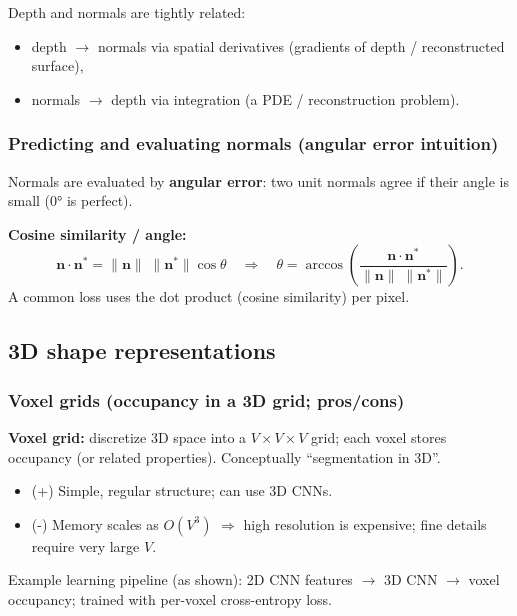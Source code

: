 \documentclass[11pt,a4paper]{article}
\newcommand{\vct}[1]{\bm{#1}}
\begin{document}
\begin{notebox}
Depth and normals are tightly related:
\begin{itemize}
  \item depth $\rightarrow$ normals via spatial derivatives (gradients of depth / reconstructed surface),
  \item normals $\rightarrow$ depth via integration (a PDE / reconstruction problem).
\end{itemize}
\end{notebox}

\subsubsection{Predicting and evaluating normals (angular error intuition)}
\begin{defbox}
Normals are evaluated by \textbf{angular error}:
two unit normals agree if their angle is small (0° is perfect).
\end{defbox}

\begin{mathrule}
\textbf{Cosine similarity / angle:}\quad
\[
\vct{n}\cdot \vct{n}^\ast = \|\vct{n}\|\;\|\vct{n}^\ast\|\cos\theta
\quad\Rightarrow\quad
\theta = \arccos\!\left(\frac{\vct{n}\cdot \vct{n}^\ast}{\|\vct{n}\|\;\|\vct{n}^\ast\|}\right).
\]
A common loss uses the dot product (cosine similarity) per pixel.
\end{mathrule}

\subsection{3D shape representations}

\subsubsection{Voxel grids (occupancy in a 3D grid; pros/cons)}
\begin{defbox}
\textbf{Voxel grid:} discretize 3D space into a $V\times V\times V$ grid; each voxel stores occupancy (or related properties).
Conceptually ``segmentation in 3D''.
\end{defbox}
\begin{itemize}
  \item (+) Simple, regular structure; can use 3D CNNs.
  \item (-) Memory scales as $O(V^3)$ $\Rightarrow$ high resolution is expensive; fine details require very large $V$.
\end{itemize}
\begin{notebox}
Example learning pipeline (as shown): 2D CNN features $\rightarrow$ 3D CNN $\rightarrow$ voxel occupancy;
trained with per-voxel cross-entropy loss.
\end{notebox}
\end{document}
